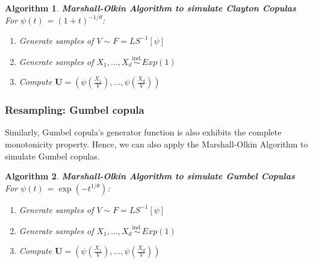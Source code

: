 \documentclass[12pt]{report}
\newtheorem{algorithmold}{Algorithm}[section]
\newcommand{\1}{\mathbf{1}}
\begin{document}
\begin{flushleft}
\begin{algorithmold}\label{MarshallOlkinAlgoClayton}
\textit{\normalfont\parencite{MarshallOlkinAlgo1988}}\:
\textbf{Marshall-Olkin Algorithm to simulate Clayton Copulas}\\
For $\psi(t)$ = $(1 + t)^{-1/\theta}$:
\begin{enumerate}
\item Generate samples of $V \sim F = LS^{-1}[\psi]$
\item Generate samples of $X_{1}, \dots, X_{d} \overset{\text{ind.}}{\sim} Exp(1)$
\item Compute $\textbf{U} = \left( \psi \left( \frac{X_{1}}{V} \right), \dots, \psi \left( \frac{X_{d}}{V} \right) \right)$
\end{enumerate}
\end{algorithmold}

\subsubsection{Resampling: Gumbel copula}
Similarly, Gumbel copula's generator function is also exhibits the complete monotonicity property. Hence, we can also apply the Marshall-Olkin Algorithm to simulate Gumbel copulas.

\begin{algorithmold}\label{MarshallOlkinAlgoGumbel}
\textit{\normalfont\parencite{MarshallOlkinAlgo1988}}\:
\textbf{Marshall-Olkin Algorithm to simulate Gumbel Copulas}\\
For $\psi(t)$ = $\exp(-t^{1/\theta})$:
\begin{enumerate}
\item Generate samples of $V \sim F = LS^{-1}[\psi]$
\item Generate samples of $X_{1}, \dots, X_{d} \overset{\text{ind.}}{\sim} Exp(1)$
\item Compute $\textbf{U} = \left( \psi \left( \frac{X_{1}}{V} \right), \dots, \psi \left( \frac{X_{d}}{V} \right) \right)$
\end{enumerate}
\end{algorithmold}


\end{flushleft}
\end{document}
